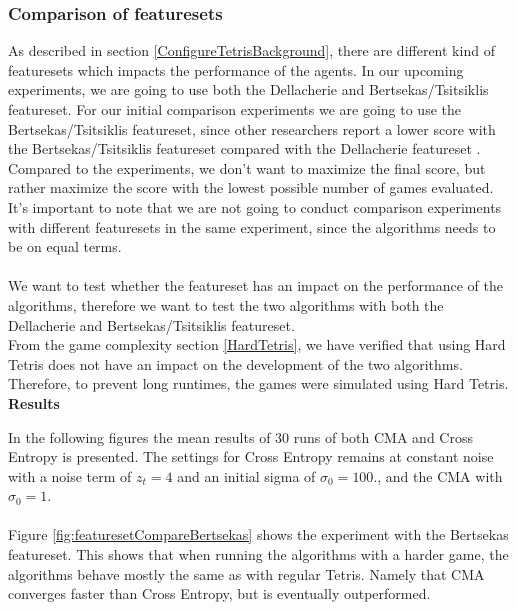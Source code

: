 \subsubsection{Comparison of featuresets  \label{compoffeatureset}}
As described in section \ref{ConfigureTetrisBackground}, there are different kind of featuresets which
impacts the performance of the agents. In our upcoming experiments, we are going to
use both the Dellacherie and Bertsekas/Tsitsiklis featureset. For our initial comparison experiments
we are going to use the Bertsekas/Tsitsiklis featureset, since other researchers report
a lower score with the Bertsekas/Tsitsiklis featureset compared with the Dellacherie featureset
\citep{thiery:09}. Compared to the \citep{thiery:09} experiments, we don't want to maximize the
final score, but rather maximize the score with the lowest possible number of 
games evaluated.\\
It's important to note that we are not going to conduct comparison experiments with different
featuresets in the same experiment, since the algorithms needs to be on equal terms.\\
\\
We want to test whether the featureset has an impact on the performance of the algorithms,
therefore we want to test the two algorithms with both the Dellacherie and Bertsekas/Tsitsiklis featureset.\\
From the game complexity section \ref{HardTetris}, we have verified that using Hard Tetris
\citep{boumaza2009} does not have an impact on the development of the two algorithms.
Therefore, to prevent long runtimes, the games were simulated
using Hard Tetris.\\

\textbf{Results}

In the following figures the mean results of 30 runs of both CMA and Cross 
Entropy is presented. The settings for Cross Entropy remains at constant noise
with a noise term of $z_t = 4$ and an initial sigma of $\sigma_0 = 100.$, 
and the CMA with $\sigma_0 = 1$.\\
\\
Figure \ref{fig:featuresetCompareBertsekas} shows the experiment with the 
Bertsekas featureset. This shows that when running the algorithms with a
harder game, the algorithms behave mostly the same as with regular 
Tetris. Namely that CMA converges faster than Cross Entropy, 
but is eventually outperformed.

